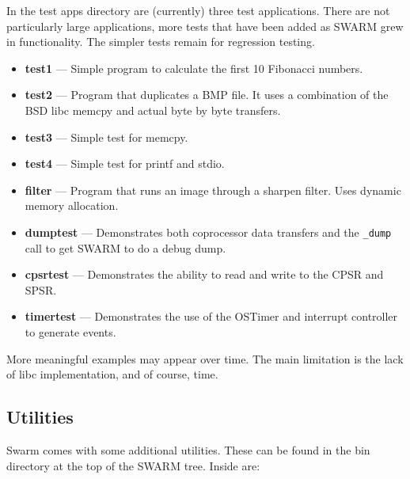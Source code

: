 \documentclass[10pt,a4paper]{article}
\begin{document}
In the test apps directory are (currently) three test
applications. There are not particularly large applications, more
tests that have been added as SWARM grew in functionality. The simpler
tests remain for regression testing.

\begin{itemize}
\itemsep 0pt
\parsep 0pt

\item \textbf{test1} --- Simple program to calculate the first 10
Fibonacci numbers.
\item \textbf{test2} --- Program that duplicates a BMP file. It uses a
combination of the BSD libc memcpy and actual byte by byte transfers.
\item \textbf{test3} --- Simple test for memcpy.
\item \textbf{test4} --- Simple test for printf and stdio.
\item \textbf{filter} --- Program that runs an image through a sharpen
filter. Uses dynamic memory allocation.
\item \textbf{dumptest} --- Demonstrates both coprocessor data
transfers and the \texttt{\_dump} call to get SWARM to do a debug
dump.
\item \textbf{cpsrtest} --- Demonstrates the ability to read and write
to the CPSR and SPSR.
\item \textbf{timertest} --- Demonstrates the use of the OSTimer and
interrupt controller to generate events.
\end{itemize}

More meaningful examples may appear over time. The main limitation is
the lack of libc implementation, and of course, time.

\subsection{Utilities} %
\label{sec:util}       %

Swarm comes with some additional utilities. These can be found in the
bin directory at the top of the SWARM tree. Inside are:
\end{document}

